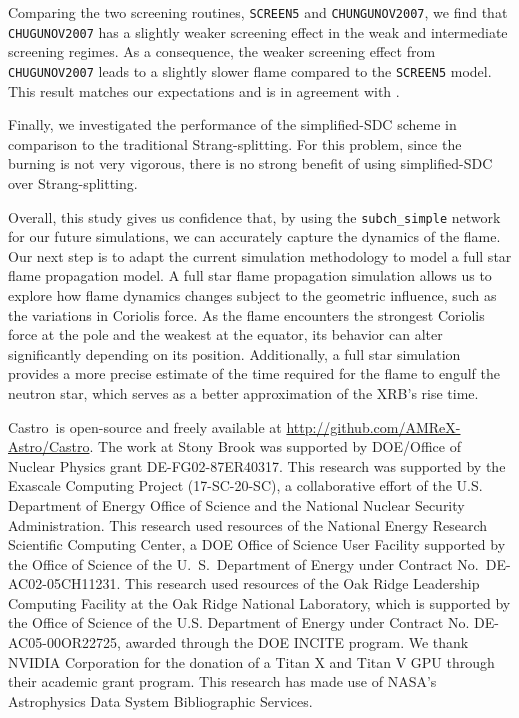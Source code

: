 \documentclass[preprint,times,tighten]{aastex631}
\newcommand{\castro}{{\sf Castro}}
\begin{document}
Comparing the two screening routines, {\tt SCREEN5} and {\tt CHUNGUNOV2007}, we find that {\tt CHUGUNOV2007} has a slightly weaker screening effect in the weak and intermediate screening regimes. As a consequence, the weaker screening effect from {\tt CHUGUNOV2007} leads to a slightly slower flame compared to the {\tt SCREEN5} model. This result matches our expectations and is in agreement with \cite{Chugunov_2007}.

Finally, we investigated the performance of the simplified-SDC scheme in comparison to the traditional Strang-splitting.  For this problem, since the burning is not very vigorous, there is no strong benefit of using simplified-SDC over Strang-splitting.


Overall, this study gives us confidence that, by using the {\tt subch\_simple} network for our future simulations, we can accurately capture the dynamics of the flame. Our next step is to adapt the current simulation methodology to model a full star flame propagation model. A full star flame propagation simulation allows us to explore how flame dynamics changes subject to the geometric influence, such as the variations in Coriolis force. As the flame encounters the strongest Coriolis force at the pole and the weakest at the equator, its behavior can alter significantly depending on its position. Additionally, a full star simulation provides a more precise estimate of the time required for the flame to engulf the neutron star, which serves as a better approximation of the XRB's rise time.






\begin{acknowledgements}
\castro\ is open-source and freely available at
\url{http://github.com/AMReX-Astro/Castro}.  The work at Stony Brook was supported by DOE/Office
of Nuclear Physics grant DE-FG02-87ER40317. This research was supported by the Exascale Computing 
Project (17-SC-20-SC), a collaborative effort of the U.S. Department of Energy
Office of Science and the National Nuclear Security Administration. This research used
resources of the National Energy Research Scientific Computing Center,
a DOE Office of Science User Facility supported by the Office of
Science of the U.~S.\ Department of Energy under Contract
No.\ DE-AC02-05CH11231.  This research used resources of the Oak Ridge
Leadership Computing Facility at the Oak Ridge National Laboratory,
which is supported by the Office of Science of the U.S. Department of
Energy under Contract No. DE-AC05-00OR22725, awarded through the DOE
INCITE program.  We thank NVIDIA Corporation for the donation of a
Titan X and Titan V GPU through their academic grant program.  This
research has made use of NASA's Astrophysics Data System Bibliographic
Services.
\end{acknowledgements}
\end{document}
